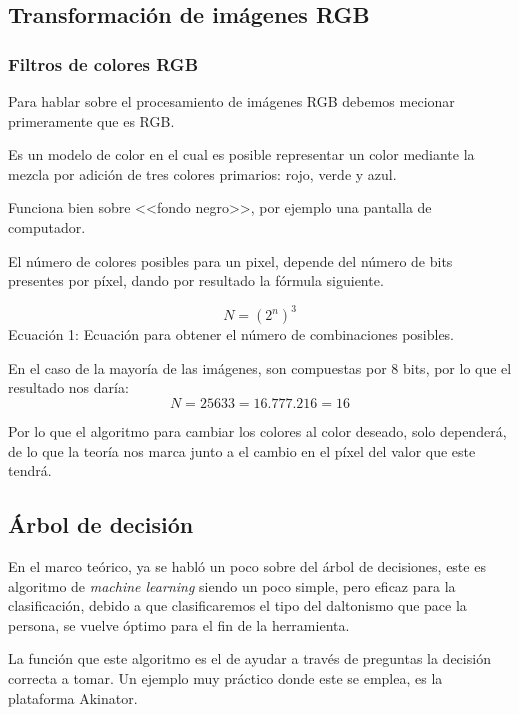 \documentclass[10pt]{article}
\begin{document}
\subsection{Transformación de imágenes RGB}
\subsubsection{Filtros de colores RGB}

Para hablar sobre el procesamiento de imágenes RGB debemos mecionar primeramente que es RGB.

Es un modelo de color en el cual es posible representar un color mediante la mezcla por adición de tres colores primarios: rojo, verde y azul\cite{IEEEreferencias:Ref43}.

Funciona bien sobre <<fondo negro>>, por ejemplo una pantalla de computador\cite{IEEEreferencias:Ref43}.

El número de colores posibles para un pixel, depende del número de bits presentes por píxel, dando por resultado la fórmula siguiente.


\begin{equation}\label{ecuacion 1}
N = (2^n)^3
\end{equation}
Ecuación 1: Ecuación para obtener el número de combinaciones posibles.

En el caso de la mayoría de las imágenes, son compuestas por 8 bits, por lo que el resultado nos daría:
\newline
\begin{equation}\label{ecuacion2}
N=25633=16.777.216=16 
\end{equation}

\setlength{\parskip}{2mm}
Por lo que el algoritmo para cambiar los colores al color deseado, solo dependerá, de lo que la teoría nos marca junto a el cambio en el píxel del valor que este tendrá.
\newpage
\subsection{Árbol de decisión}
En el marco teórico, ya se habló un poco sobre del árbol de decisiones, este es algoritmo de  \textit{machine learning} siendo un poco simple, pero eficaz para la clasificación, debido a que clasificaremos el tipo del daltonismo que pace la persona, se vuelve óptimo para el fin de la herramienta.

La función que este algoritmo es el de ayudar a través de preguntas la decisión correcta a tomar. Un ejemplo muy práctico donde este se emplea, es la plataforma Akinator\textcopyright.
\end{document}
